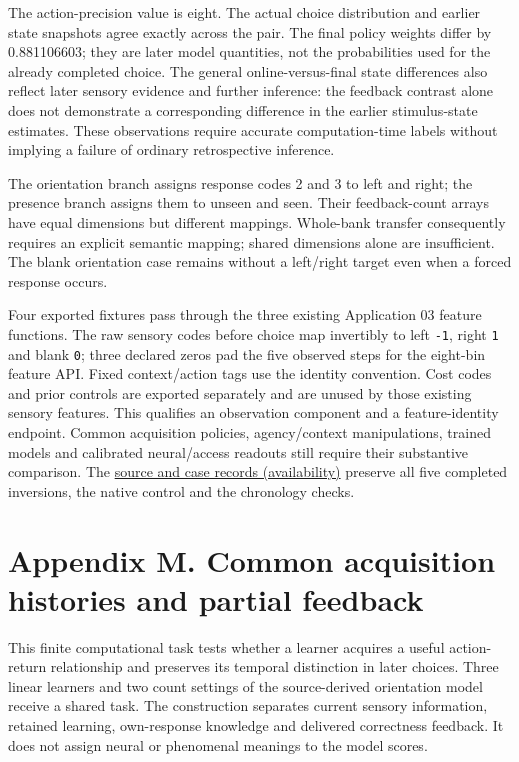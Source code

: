 \documentclass[
  american,
  11pt,
  letterpaper,
]{article}
\begin{document}
The action-precision value is eight. The actual choice distribution and earlier state snapshots agree exactly across the pair. The final policy weights differ by 0.881106603; they are later model quantities, not the probabilities used for the already completed choice. The general online-versus-final state differences also reflect later sensory evidence and further inference: the feedback contrast alone does not demonstrate a corresponding difference in the earlier stimulus-state estimates. These observations require accurate computation-time labels without implying a failure of ordinary retrospective inference.

The orientation branch assigns response codes 2 and 3 to left and right; the presence branch assigns them to unseen and seen. Their feedback-count arrays have equal dimensions but different mappings. Whole-bank transfer consequently requires an explicit semantic mapping; shared dimensions alone are insufficient. The blank orientation case remains without a left/right target even when a forced response occurs.

Four exported fixtures pass through the three existing Application 03 feature functions. The raw sensory codes before choice map invertibly to left \texttt{-1}, right \texttt{1} and blank \texttt{0}; three declared zeros pad the five observed steps for the eight-bin feature API. Fixed context/action tags use the identity convention. Cost codes and prior controls are exported separately and are unused by those existing sensory features. This qualifies an observation component and a feature-identity endpoint. Common acquisition policies, agency/context manipulations, trained models and calibrated neural/access readouts still require their substantive comparison. The \href{https://github.com/v5ma/v5ma.github.io/blob/master/papers/companions/learning-to-feel-v1.0/ARTIFACT-AVAILABILITY.md\#artifact-41}{source and case records (availability)} preserve all five completed inversions, the native control and the chronology checks.

\clearpage
\begingroup\setlength{\parskip}{2pt plus 1pt minus 1pt}
\hypertarget{appendix-m}{}

\section{Appendix M. Common acquisition histories and partial feedback}\label{appendix-m.-common-acquisition-histories-and-partial-feedback}

This finite computational task tests whether a learner acquires a useful action-return relationship and preserves its temporal distinction in later choices. Three linear learners and two count settings of the source-derived orientation model receive a shared task. The construction separates current sensory information, retained learning, own-response knowledge and delivered correctness feedback. It does not assign neural or phenomenal meanings to the model scores.
\end{document}
